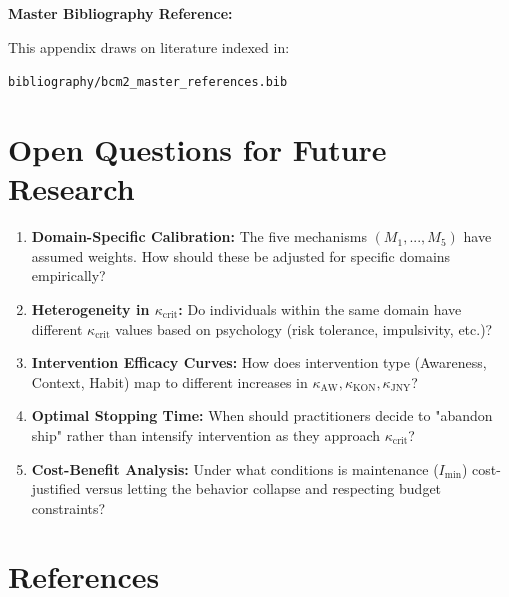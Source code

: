 \documentclass[11pt, a4paper]{article}
\begin{document}
\textbf{Master Bibliography Reference:}

This appendix draws on literature indexed in:

\texttt{bibliography/bcm2\_master\_references.bib}

\nocite{bcm2_master}


\section{Open Questions for Future Research}

\begin{enumerate}
    \item \textbf{Domain-Specific Calibration:}
    The five mechanisms $(M_1,...,M_5)$ have assumed weights.
    How should these be adjusted for specific domains empirically?

    \item \textbf{Heterogeneity in $\kappa_{\text{crit}}$:}
    Do individuals within the same domain have different $\kappa_{\text{crit}}$ values
    based on psychology (risk tolerance, impulsivity, etc.)?

    \item \textbf{Intervention Efficacy Curves:}
    How does intervention type (Awareness, Context, Habit) map to different
    increases in $\kappa_{\text{AW}}, \kappa_{\text{KON}}, \kappa_{\text{JNY}}$?

    \item \textbf{Optimal Stopping Time:}
    When should practitioners decide to "abandon ship" rather than intensify
    intervention as they approach $\kappa_{\text{crit}}$?

    \item \textbf{Cost-Benefit Analysis:}
    Under what conditions is maintenance ($I_{\min}$) cost-justified versus
    letting the behavior collapse and respecting budget constraints?
\end{enumerate}


\section{References}
\end{document}
